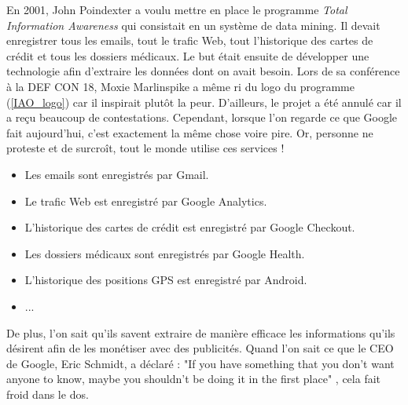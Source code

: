 En 2001, John Poindexter a voulu mettre en place le programme \textit{Total Information Awareness} qui consistait en un système de data mining. Il devait enregistrer tous les emails, tout le trafic Web, tout l'historique des cartes de crédit et tous les dossiers médicaux. Le but était ensuite de développer une technologie afin d'extraire les données dont on avait besoin. Lors de sa conférence à la DEF CON 18, Moxie Marlinspike a même ri du logo du programme (\autoref{IAO_logo}) car il inspirait plutôt la peur. D'ailleurs, le projet a été annulé car il a reçu beaucoup de contestations. Cependant, lorsque l'on regarde ce que Google fait aujourd'hui, c'est exactement la même chose voire pire. Or, personne ne proteste et de surcroît, tout le monde utilise ces services !
\begin{itemize}
  \item Les emails sont enregistrés par Gmail.
  \item Le trafic Web est enregistré par Google Analytics.
  \item L'historique des cartes de crédit est enregistré par Google Checkout.
  \item Les dossiers médicaux sont enregistrés par Google Health.
  \item L'historique des positions GPS est enregistré par Android.
  \item ...
\end{itemize}
De plus, l'on sait qu'ils savent extraire de manière efficace les informations qu'ils désirent afin de les monétiser avec des publicités. Quand l'on sait ce que le CEO de Google, Eric Schmidt, a déclaré : "If you have something that you don't want anyone to know, maybe you shouldn't be doing it in the first place" \cite{privacy_eric_schmidt}, cela fait froid dans le dos.

